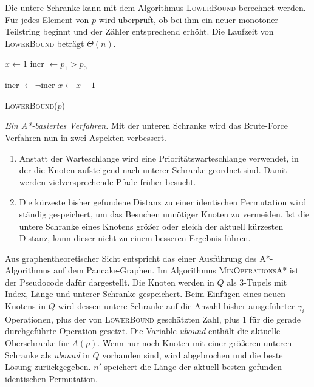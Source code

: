 \documentclass[a4paper, 10pt, ngerman]{article}
\begin{document}
Die untere Schranke kann mit dem Algorithmus \textsc{LowerBound} berechnet werden. Für jedes Element von $p$ wird überprüft, ob bei ihm ein neuer monotoner Teilstring beginnt und der Zähler entsprechend erhöht. Die Laufzeit von \textsc{LowerBound} beträgt $\Theta(n)$.
\bigskip

\begin{algorithm}
    {
         \;
    }

    $x \gets 1$ \;
    incr $\gets p_1 > p_0$ \;

    {
        {
            incr $\gets \neg$incr \;
            $x \gets x + 1$ \;
        }
    }

     \;

    \caption{\textsc{LowerBound}($p$)}
\end{algorithm}

\emph{Ein A*-basiertes Verfahren.} Mit der unteren Schranke wird das Brute-Force Verfahren nun in zwei Aspekten verbessert.

\begin{enumerate}
    \item Anstatt der Warteschlange wird eine Prioritätswarteschlange verwendet, in der die Knoten aufsteigend nach unterer Schranke geordnet sind. Damit werden vielversprechende Pfade früher besucht.
    \item Die kürzeste bisher gefundene Distanz zu einer identischen Permutation wird ständig gespeichert, um das Besuchen unnötiger Knoten zu vermeiden. Ist die untere Schranke eines Knotens größer oder gleich der aktuell kürzesten Distanz, kann dieser nicht zu einem besseren Ergebnis führen.
\end{enumerate}

Aus graphentheoretischer Sicht entspricht das einer Ausführung des A*-Algorithmus auf dem Pancake-Graphen. Im Algorithmus \textsc{MinOperationsA*} ist der Pseudocode dafür dargestellt. Die Knoten werden in $Q$ als 3-Tupels mit Index, Länge und unterer Schranke gespeichert. Beim Einfügen eines neuen Knotens in $Q$ wird dessen untere Schranke auf die Anzahl bisher ausgeführter $\gamma_i$-Operationen, plus der von \textsc{LowerBound} geschätzten Zahl, plus 1 für die gerade durchgeführte Operation gesetzt. Die Variable \emph{ubound} enthält die aktuelle Oberschranke für $A(p)$. Wenn nur noch Knoten mit einer größeren unteren Schranke als \emph{ubound} in $Q$ vorhanden sind, wird abgebrochen und die beste Lösung zurückgegeben. $n'$ speichert die Länge der aktuell besten gefunden identischen Permutation.
\end{document}
